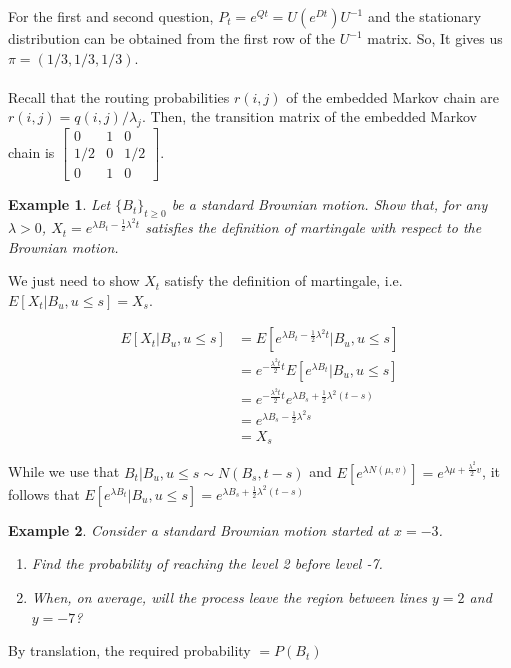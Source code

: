 \documentclass[12pt]{article}
\newtheorem{example}{Example}
\begin{document}
\noindent For the first and second question, $P_t = e^{Qt} = U(e^{Dt})U^{-1}$ and the stationary distribution can be obtained from the first row of the $U^{-1}$ matrix. So, It gives us $\pi = (1/3, 1/3, 1/3)$.
\\
\\Recall that the routing probabilities $r(i,j)$ of the embedded Markov chain are $r(i,j) = q(i,j)/\lambda_j$. Then, the transition matrix of the embedded Markov chain is
$\begin{bmatrix}
     0 & 1 & 0\\
     1/2 & 0 & 1/2\\
     0 & 1 & 0
\end{bmatrix}$.

\begin{example}
    Let $\{B_t\}_{t \geq 0}$ be a standard Brownian motion. Show that, for any $\lambda > 0$, $X_t = e^{\lambda B_t - \frac{1}{2}\lambda ^2 t}$ satisfies the definition of martingale with respect to the Brownian motion.
\end{example}

\noindent We just need to show $X_t$ satisfy the definition of martingale, i.e. $E[X_t | B_u, u \leq s] = X_s$.
\begin{center}
    \begin{align*}
        E[X_t| B_u, u \leq s] & = E[e^{\lambda B_t - \frac{1}{2}\lambda ^2 t} | B_u, u \leq s] \\
        & = e^{-\frac{\lambda^2 t}{2}t} E[e^{\lambda B_t} | B_u, u \leq s] \\
        & = e^{-\frac{\lambda^2 t}{2}t} e^{\lambda B_s + \frac{1}{2}\lambda ^2 (t - s)} \\
        & = e^{\lambda B_s - \frac{1}{2}\lambda ^2 s} \\
        & = X_s
    \end{align*}
\end{center}
While we use that $B_t | B_u, u \leq s \sim N(B_s, t - s)$ and $E[e^{\lambda N(\mu,v)}] = e^{\lambda \mu + \frac{\lambda ^2}{2}v}$, it follows that $E[e^{\lambda B_t} | B_u, u \leq s] = e^{\lambda B_s + \frac{1}{2}\lambda ^2 (t - s)}$

\begin{example}
    Consider a standard Brownian motion started at $x = -3$.
    \begin{enumerate}
        \item Find the probability of reaching the level 2 before level -7.
        \item When, on average, will the process leave the region between lines $y = 2$ and $y = -7$?
    \end{enumerate}
\end{example}

\noindent By translation, the required probability $= P(B_t )$
\end{document}
